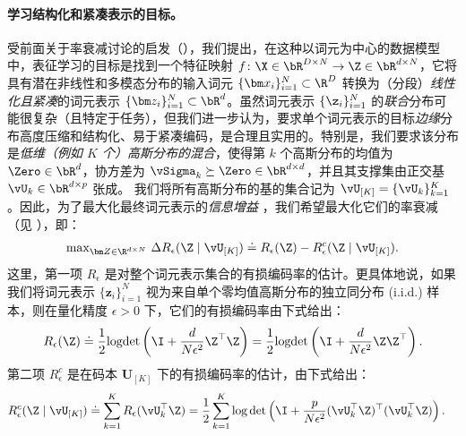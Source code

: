 \documentclass[../../book-main_zh.tex]{subfiles}
\begin{document}
\paragraph{学习结构化和紧凑表示的目标。}
受前面关于率衰减讨论的启发（），我们提出，在这种以词元为中心的数据模型中，表征学习的目标是找到一个特征映射 \(f \colon \X \in \bR^{D \times N} \to \Z\in \bR^{d \times N}\)，它将具有潜在非线性和多模态分布的输入词元 \(\{\bm x_i\}_{i=1}^N \subset \R^D\) 转换为（分段）\textit{线性化且紧凑}的词元表示 \(\{\bm z_i\}_{i=1}^N \subset \bR^{d}\)。虽然词元表示 \(\{\z_{i}\}_{i = 1}^{N}\) 的{\em 联合}分布可能很复杂（且特定于任务），但我们进一步认为，要求单个词元表示的目标{\em 边缘}分布高度压缩和结构化、易于紧凑编码，是合理且实用的。特别是，我们要求该分布是\textit{低维（例如 \(K\) 个）高斯分布的混合}，使得第 \(k\) 个高斯分布的均值为 \(\Zero \in \bR^{d}\)，协方差为 \(\vSigma_{k} \succeq \Zero \in \bR^{d \times d}\)，并且其支撑集由正交基 \(\vU_{k} \in \bR^{d \times p}\) 张成。
我们将所有高斯分布的基的集合记为 $\vU_{[K]} = \{\vU_k\}_{k=1}^K$。因此，为了最大化最终词元表示的\textit{信息增益} \cite{ma2022principles}，我们希望最大化它们的率衰减（见 ），即：
\begin{align}\label{eq:rate reduction}
    \mathrm{max}_{\bm Z \in \R^{d\times N}}\ \Delta R_{\epsilon}(\Z
    \mid \vU_{[K]}) \doteq R_{\epsilon}(\Z) - R^c_{\epsilon}(\Z \mid \vU_{[K]}).
\end{align}
这里，第一项 $R_{\epsilon}$ 是对整个词元表示集合的有损编码率的估计。更具体地说，如果我们将词元表示 $\{\bm z_i\}_{i=1}^N$ 视为来自单个零均值高斯分布的独立同分布 (i.i.d.) 样本，则在量化精度 $\epsilon > 0$ 下，它们的有损编码率由下式给出：
\begin{equation}\label{eq:coding_rate}
    R_{\epsilon}(\Z) \doteq \frac{1}{2}\textrm{logdet}\left(\I +
    \frac{d}{N\epsilon^{2}}\Z^{\top}\Z\right) =
    \frac{1}{2}\textrm{logdet}\left(\I +
    \frac{d}{N\epsilon^{2}}\Z\Z^{\top}\right).
\end{equation}
第二项 $R_{\epsilon}^c$ 是在码本 $\bm U_{[K]}$ 下的有损编码率的估计，由下式给出：
\begin{equation}
    \begin{aligned}
        R_{\epsilon}^c(\Z \mid \vU_{[K]}) &\doteq
        \sum_{k=1}^{K}R_{\epsilon}(\vU_k^{\top} \Z) =
        \frac{1}{2}\sum_{k=1}^{K}\log\det\left(\I +
        \frac{p}{N\epsilon^{2}}(\vU_k^{\top}\Z)^{\top}(\vU_k^{\top}\Z)\right).
    \end{aligned}
    \label{eq:def-mcr-Rc}
\end{equation}
\end{document}
